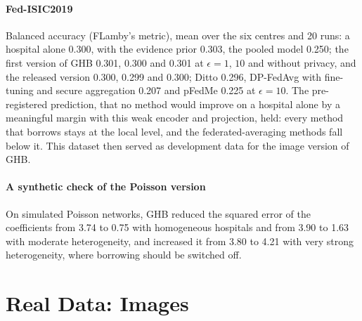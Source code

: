 \documentclass[acmsmall,screen,nonacm]{acmart}
\theoremstyle{acmdefinition}
\begin{document}
\paragraph{Fed-ISIC2019} Balanced accuracy (FLamby's metric), mean over the six centres and 20 runs: a hospital alone 0.300, with the evidence prior 0.303, the pooled model 0.250; the first version of GHB 0.301, 0.300 and 0.301 at $\epsilon=1$, $10$ and without privacy, and the released version 0.300, 0.299 and 0.300; Ditto \cite{li2021ditto} 0.296, DP-FedAvg \cite{mcmahan2018learning} with fine-tuning and secure aggregation \cite{bonawitz2017practical} 0.207 and pFedMe \cite{tdinh2020personalized} 0.225 at $\epsilon=10$. The pre-registered prediction, that no method would improve on a hospital alone by a meaningful margin with this weak encoder and projection, held: every method that borrows stays at the local level, and the federated-averaging methods fall below it. This dataset then served as development data for the image version of GHB.

\paragraph{A synthetic check of the Poisson version} On simulated Poisson networks, GHB reduced the squared error of the coefficients from 3.74 to 0.75 with homogeneous hospitals and from 3.90 to 1.63 with moderate heterogeneity, and increased it from 3.80 to 4.21 with very strong heterogeneity, where borrowing should be switched off.

\section{Real Data: Images}\label{sec:images}
\end{document}

